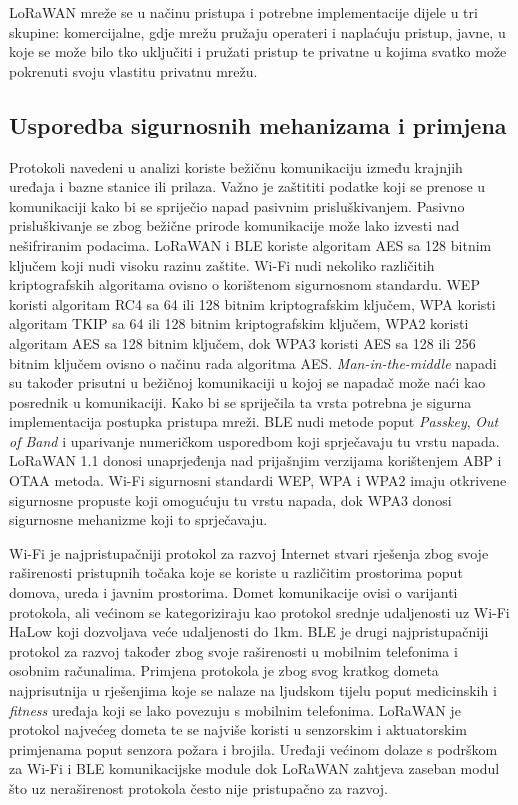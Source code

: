 \documentclass[times, utf8, diplomski]{fer}
\begin{document}
LoRaWAN mreže se u načinu pristupa i potrebne implementacije dijele u tri skupine: komercijalne, gdje mrežu pružaju operateri i naplaćuju pristup, javne, u koje se može bilo tko uključiti i pružati pristup te privatne u kojima svatko može pokrenuti svoju vlastitu privatnu mrežu.

\subsection{Usporedba sigurnosnih mehanizama i primjena}
Protokoli navedeni u analizi koriste bežičnu komunikaciju između krajnjih uređaja i bazne stanice ili prilaza. Važno je zaštititi podatke koji se prenose u komunikaciji kako bi se spriječio napad pasivnim prisluškivanjem. Pasivno prisluškivanje se zbog bežične prirode komunikacije može lako izvesti nad nešifriranim podacima. LoRaWAN i BLE koriste algoritam AES sa 128 bitnim ključem koji nudi visoku razinu zaštite. Wi-Fi nudi nekoliko različitih kriptografskih algoritama ovisno o korištenom sigurnosnom standardu. WEP koristi algoritam RC4 sa 64 ili 128 bitnim kriptografskim ključem, WPA koristi algoritam TKIP sa 64 ili 128 bitnim kriptografskim ključem, WPA2 koristi algoritam AES sa 128 bitnim ključem, dok WPA3 koristi AES sa 128 ili 256 bitnim ključem ovisno o načinu rada algoritma AES. \emph{Man-in-the-middle} napadi su također prisutni u bežičnoj komunikaciji u kojoj se napadač može naći kao posrednik u komunikaciji. Kako bi se spriječila ta vrsta potrebna je sigurna implementacija postupka pristupa mreži. BLE nudi metode poput \emph{Passkey}, \emph{Out of Band} i uparivanje numeričkom usporedbom koji sprječavaju tu vrstu napada. LoRaWAN 1.1 donosi unaprjeđenja nad prijašnjim verzijama korištenjem ABP i OTAA metoda. Wi-Fi sigurnosni standardi WEP, WPA i WPA2 imaju otkrivene sigurnosne propuste koji omogućuju tu vrstu napada, dok WPA3 donosi sigurnosne mehanizme koji to sprječavaju.  

Wi-Fi je najpristupačniji protokol za razvoj Internet stvari rješenja zbog svoje raširenosti pristupnih točaka koje se koriste u različitim prostorima poput domova, ureda i javnim prostorima. Domet komunikacije ovisi o varijanti protokola, ali većinom se kategoriziraju kao protokol srednje udaljenosti uz Wi-Fi HaLow koji dozvoljava veće udaljenosti do 1km. BLE je drugi najpristupačniji protokol za razvoj također zbog svoje raširenosti u mobilnim telefonima i osobnim računalima. Primjena protokola je zbog svog kratkog dometa najprisutnija u rješenjima koje se nalaze na ljudskom tijelu poput medicinskih i \emph{fitness} uređaja koji se lako povezuju s mobilnim telefonima. LoRaWAN je protokol najvećeg dometa te se najviše koristi u senzorskim i aktuatorskim primjenama poput senzora požara i brojila. Uređaji većinom dolaze s podrškom za Wi-Fi i BLE komunikacijske module dok LoRaWAN zahtjeva zaseban modul što uz neraširenost protokola često nije pristupačno za razvoj.
\end{document}
